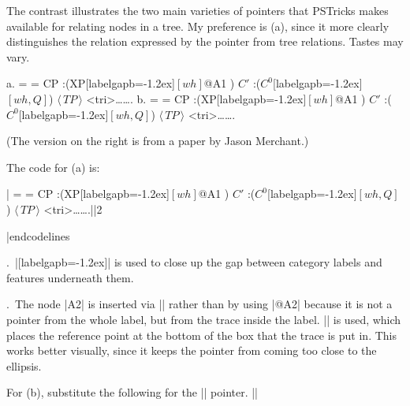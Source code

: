 
\example \ftagEx[ExMerchant]

The contrast illustrates the two main varieties of pointers that
PSTricks makes available for relating nodes in a tree. My
preference is (a), since it more clearly distinguishes the
relation expressed by the pointer from tree relations. Tastes may
vary.

\exdisplay
\hfil
a.\quad
%
\jtree[xunit=3em,yunit=2.5ex]
\def\\{[labelgapb=-1.2ex]}%
\everymath={\rm}%
\! = {CP}
   :({XP}\\{$\scriptstyle [wh]$}@A1 ) {$C'$}
   :({$C^0$}\\{$\scriptstyle [wh,Q]$}) {$\langle\, TP\,\rangle$}
   <tri>{\dots\quad{}\quad\dots}.
\endjtree
%
\hfil
b.\quad
\jtree[xunit=2.6em,yunit=2.2ex,bbadjust=depth 3ex]
\def\\{[labelgapb=-1.2ex]}%
\everymath={\rm}%
\! = {CP}
   :({XP}\\{$\scriptstyle [wh]$}@A1 )  {$C'$}
   :({$C^0$}\\{$\scriptstyle [wh,Q]$}) {$\langle\, TP\,\rangle$}
   <tri>{\dots\quad{}\quad \dots}.
\endjtree
\xe

(The version on the right is from a paper by Jason Merchant.)
\medskip

\goodbreak
The code for (a) is:\par\nobreak

\medskip
\codelines
|\jtree[xunit=3em,yunit=2.5ex]
\def\\{[labelgapb=-1.2ex]}%
\everymath={\rm}%
\! = {CP}
   :({XP}\\{$\scriptstyle [wh]$}@A1 ) {$C'$}
   :({$C^0$}\\{$\scriptstyle [wh,Q]$})
      {$\langle\, TP\,\rangle$}
   <tri>{\dots\quad{}\quad\dots}.||2
\endjtree

|endcodelines

.\ |\\| is used to close up the gap between category labels and
features underneath them.

.\ The node |A2| is inserted via |\rnode| rather than
by using |@A2| because it is not a pointer from the whole label,
but from the trace inside the label.  |\rnode[b]| is used, which
places the reference point at the bottom of the box that the
trace is put in.  This works better visually, since it keeps the
pointer from coming too close to the ellipsis.

\bigskip
For (b), substitute the following for the
|\nccurve| pointer.
\medskip
||

